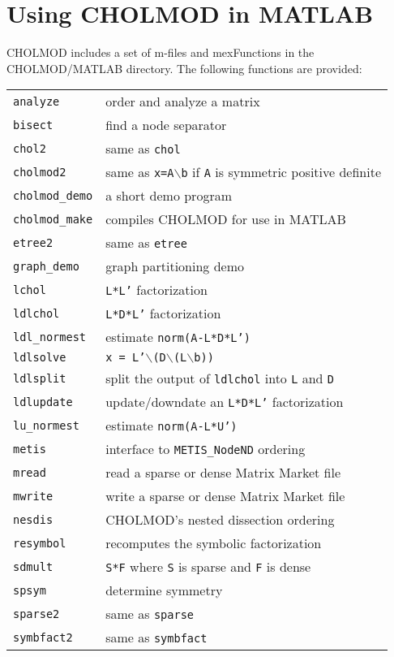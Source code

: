 \documentclass[11pt]{article}
\begin{document}
\newpage \section{Using CHOLMOD in MATLAB}

CHOLMOD includes a set of m-files and mexFunctions in the CHOLMOD/MATLAB
directory.  The following functions are provided:

\vspace{0.1in}
\begin{tabular}{ll}
\hline
{\tt analyze}	    & order and analyze a matrix \\
{\tt bisect}	    & find a node separator \\
{\tt chol2}	    & same as {\tt chol} \\
{\tt cholmod2}	    & same as {\tt x=A}$\backslash${\tt b} if {\tt A} is symmetric positive definite \\
{\tt cholmod\_demo} & a short demo program \\
{\tt cholmod\_make} & compiles CHOLMOD for use in MATLAB \\
{\tt etree2}	    & same as {\tt etree} \\
{\tt graph\_demo}   & graph partitioning demo \\
{\tt lchol}	    & {\tt L*L'} factorization \\
{\tt ldlchol}	    & {\tt L*D*L'} factorization \\
{\tt ldl\_normest}  & estimate {\tt norm(A-L*D*L')} \\
{\tt ldlsolve}	    & {\tt x = L'}$\backslash${\tt (D}$\backslash${\tt (L}$\backslash${\tt b))} \\
{\tt ldlsplit}	    & split the output of {\tt ldlchol} into {\tt L} and {\tt D} \\
{\tt ldlupdate}	    & update/downdate an {\tt L*D*L'} factorization \\
{\tt lu\_normest}   & estimate {\tt norm(A-L*U')} \\
{\tt metis}	    & interface to {\tt METIS\_NodeND} ordering \\
{\tt mread}	    & read a sparse or dense Matrix Market file \\
{\tt mwrite}	    & write a sparse or dense Matrix Market file \\
{\tt nesdis}	    & CHOLMOD's nested dissection ordering \\
{\tt resymbol}	    & recomputes the symbolic factorization \\
{\tt sdmult}	    & {\tt S*F} where {\tt S} is sparse and {\tt F} is dense \\
{\tt spsym}	    & determine symmetry \\
{\tt sparse2}	    & same as {\tt sparse} \\
{\tt symbfact2}	    & same as {\tt symbfact} \\
\hline
\end{tabular}
\end{document}
